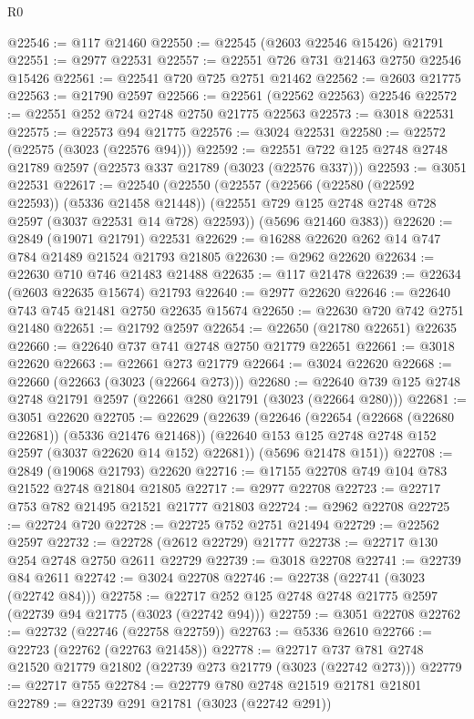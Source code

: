 \begin{lexlean}{R0}
\begin{coremodule}
@22546 := @117 @21460
@22550 := @22545 (@2603 @22546 @15426) @21791
@22551 := @2977 @22531
@22557 := @22551 @726 @731 @21463 @2750 @22546 @15426
@22561 := @22541 @720 @725 @2751 @21462
@22562 := @2603 @21775
@22563 := @21790 @2597
@22566 := @22561 (@22562 @22563) @22546
@22572 := @22551 @252 @724 @2748 @2750 @21775 @22563
@22573 := @3018 @22531
@22575 := @22573 @94 @21775
@22576 := @3024 @22531
@22580 := @22572 (@22575 (@3023 (@22576 @94)))
@22592 := @22551 @722 @125 @2748 @2748 @21789 @2597 (@22573 @337 @21789 (@3023 (@22576 @337)))
@22593 := @3051 @22531
@22617 := @22540
    (@22550
      (@22557
        (@22566 (@22580 (@22592 @22593)) (@5336 @21458 @21448))
        (@22551 @729 @125 @2748 @2748 @728 @2597 (@3037 @22531 @14 @728) @22593))
      (@5696 @21460 @383))
@22620 := @2849 (@19071 @21791) @22531
@22629 := @16288 @22620 @262 @14 @747 @784 @21489 @21524 @21793 @21805
@22630 := @2962 @22620
@22634 := @22630 @710 @746 @21483 @21488
@22635 := @117 @21478
@22639 := @22634 (@2603 @22635 @15674) @21793
@22640 := @2977 @22620
@22646 := @22640 @743 @745 @21481 @2750 @22635 @15674
@22650 := @22630 @720 @742 @2751 @21480
@22651 := @21792 @2597
@22654 := @22650 (@21780 @22651) @22635
@22660 := @22640 @737 @741 @2748 @2750 @21779 @22651
@22661 := @3018 @22620
@22663 := @22661 @273 @21779
@22664 := @3024 @22620
@22668 := @22660 (@22663 (@3023 (@22664 @273)))
@22680 := @22640 @739 @125 @2748 @2748 @21791 @2597 (@22661 @280 @21791 (@3023 (@22664 @280)))
@22681 := @3051 @22620
@22705 := @22629
    (@22639
      (@22646
        (@22654 (@22668 (@22680 @22681)) (@5336 @21476 @21468))
        (@22640 @153 @125 @2748 @2748 @152 @2597 (@3037 @22620 @14 @152) @22681))
      (@5696 @21478 @151))
@22708 := @2849 (@19068 @21793) @22620
@22716 := @17155 @22708 @749 @104 @783 @21522 @2748 @21804 @21805
@22717 := @2977 @22708
@22723 := @22717 @753 @782 @21495 @21521 @21777 @21803
@22724 := @2962 @22708
@22725 := @22724 @720
@22728 := @22725 @752 @2751 @21494
@22729 := @22562 @2597
@22732 := @22728 (@2612 @22729) @21777
@22738 := @22717 @130 @254 @2748 @2750 @2611 @22729
@22739 := @3018 @22708
@22741 := @22739 @84 @2611
@22742 := @3024 @22708
@22746 := @22738 (@22741 (@3023 (@22742 @84)))
@22758 := @22717 @252 @125 @2748 @2748 @21775 @2597 (@22739 @94 @21775 (@3023 (@22742 @94)))
@22759 := @3051 @22708
@22762 := @22732 (@22746 (@22758 @22759))
@22763 := @5336 @2610
@22766 := @22723 (@22762 (@22763 @21458))
@22778 := @22717 @737 @781 @2748 @21520 @21779 @21802 (@22739 @273 @21779 (@3023 (@22742 @273)))
@22779 := @22717 @755
@22784 := @22779 @780 @2748 @21519 @21781 @21801
@22789 := @22739 @291 @21781 (@3023 (@22742 @291))

\end{coremodule}
\end{lexlean}
